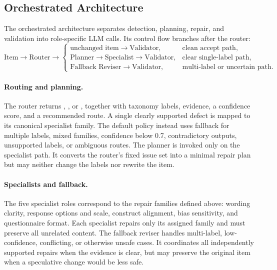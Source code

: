 \documentclass[11pt,a4paper]{article}
\newcommand{\code}[1]{%
    \texttt{\detokenize{#1}}%
}
\begin{document}
\subsection{Orchestrated Architecture}
\label{subsec:orchestration}

The orchestrated architecture separates detection, planning, repair, and
validation into role-specific LLM calls. Its control flow branches after the
router:
\[
    \text{Item}\rightarrow\text{Router}\rightarrow
    \begin{cases}
        \text{unchanged item}\rightarrow\text{Validator},
        & \text{clean accept path},\\
        \text{Planner}\rightarrow\text{Specialist}\rightarrow\text{Validator},
        & \text{clear single-label path},\\
        \text{Fallback Reviser}\rightarrow\text{Validator},
        & \text{multi-label or uncertain path}.
    \end{cases}
\]

\paragraph{Routing and planning.}
The router returns \code{accept}, \code{revise}, or \code{fallback}, together
with taxonomy labels, evidence, a confidence score, and a recommended route. A
single clearly supported defect is mapped to its canonical specialist family.
The default policy instead uses fallback for multiple labels, mixed families,
confidence below 0.7, contradictory outputs, unsupported labels, or ambiguous
routes. The planner is invoked only on the specialist path. It converts the
router's fixed issue set into a minimal repair plan but may neither change the
labels nor rewrite the item.

\paragraph{Specialists and fallback.}
The five specialist roles correspond to the repair families defined above:
wording clarity, response options and scale, construct alignment, bias
sensitivity, and questionnaire format. Each
specialist repairs only its assigned family and must preserve all unrelated
content. The fallback reviser handles multi-label, low-confidence, conflicting,
or otherwise unsafe cases. It coordinates all independently supported repairs
when the evidence is clear, but may preserve the original item when a speculative
change would be less safe.
\end{document}
